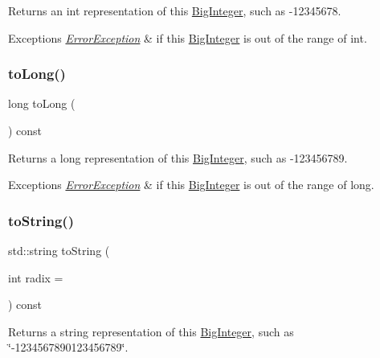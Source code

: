 Returns an int representation of this \mbox{\hyperlink{classBigInteger}{Big\+Integer}}, such as -\/12345678. 


\begin{DoxyExceptions}{Exceptions}
{\em \mbox{\hyperlink{classErrorException}{Error\+Exception}}} & if this \mbox{\hyperlink{classBigInteger}{Big\+Integer}} is out of the range of int. \\
\hline
\end{DoxyExceptions}
\mbox{\label{classBigInteger_aa762dbabd60643be2be9aa9eb14deddb}} 
\subsubsection{\texorpdfstring{to\+Long()}{toLong()}}
{\footnotesize\ttfamily long to\+Long (\begin{DoxyParamCaption}{ }\end{DoxyParamCaption}) const}



Returns a long representation of this \mbox{\hyperlink{classBigInteger}{Big\+Integer}}, such as -\/123456789. 


\begin{DoxyExceptions}{Exceptions}
{\em \mbox{\hyperlink{classErrorException}{Error\+Exception}}} & if this \mbox{\hyperlink{classBigInteger}{Big\+Integer}} is out of the range of long. \\
\hline
\end{DoxyExceptions}
\mbox{\label{classBigInteger_a23af335cf9a414459a10205e2031c182}} 
\subsubsection{\texorpdfstring{to\+String()}{toString()}}
{\footnotesize\ttfamily std\+::string to\+String (\begin{DoxyParamCaption}\item[{int}]{radix = {} }\end{DoxyParamCaption}) const}



Returns a string representation of this \mbox{\hyperlink{classBigInteger}{Big\+Integer}}, such as \char`\"{}-\/1234567890123456789\char`\"{}. 



